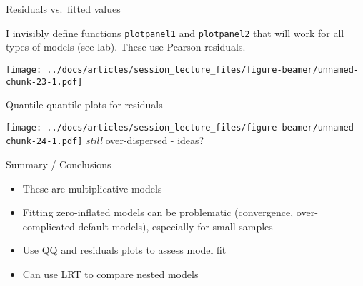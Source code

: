\documentclass[
  ignorenonframetext,
]{beamer}
\providecommand{\tightlist}{%
  \setlength{\itemsep}{0pt}\setlength{\parskip}{0pt}}
\begin{document}
\begin{frame}[fragile]{Residuals vs.~fitted values}
\protect\hypertarget{residuals-vs.-fitted-values}{}

I invisibly define functions \texttt{plotpanel1} and \texttt{plotpanel2}
that will work for all types of models (see lab). These use Pearson
residuals.

\texttt{[image: ../docs/articles/session\_lecture\_files/figure-beamer/unnamed-chunk-23-1.pdf]}

\end{frame}

\begin{frame}{Quantile-quantile plots for residuals}
\protect\hypertarget{quantile-quantile-plots-for-residuals}{}

\texttt{[image: ../docs/articles/session\_lecture\_files/figure-beamer/unnamed-chunk-24-1.pdf]}
\emph{still} over-dispersed - ideas?

\end{frame}

\begin{frame}{Summary / Conclusions}
\protect\hypertarget{summary-conclusions}{}

\begin{itemize}
\tightlist
\item
  These are multiplicative models
\item
  Fitting zero-inflated models can be problematic (convergence,
  over-complicated default models), especially for small samples
\item
  Use QQ and residuals plots to assess model fit
\item
  Can use LRT to compare nested models
\end{itemize}

\end{frame}
\end{document}
